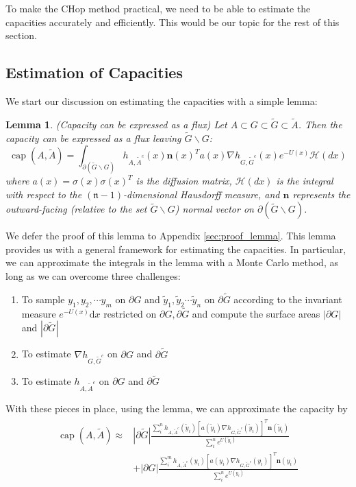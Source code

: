 \documentclass[english, aip, jcp, priprint, graphicx,floatfix]{revtex4-1}
\newtheorem{lemma}{Lemma}
\theoremstyle{plain}
\theoremstyle{definition}
\theoremstyle{plain}
\newcommand{\dimension}{{\mathfrak{n}}}
\newcommand{\hausdorffmeasure}{\mathscr{H}(dx)}
\begin{document}
To make the CHop method practical, we need to be able to estimate the capacities accurately and efficiently. This would be our topic for the rest of this section.

\subsection{Estimation of Capacities}

We start our discussion on estimating the capacities with a simple lemma:
\begin{lemma}(Capacity can be expressed as a flux) \label{lem:capacity_lemma} Let $A\subset G \subset \tilde G \subset \tilde A$.  Then the capacity can be expressed as a flux leaving $\tilde G \backslash G$:
\begin{equation*}
\ensuremath{\operatorname{cap}} (A, \tilde{A}) = \int_{\partial (\tilde G \backslash G)}  h_{A, \tilde{A}^c} (x)   \textbf{n}(x)^T a (x) \nabla h_{G, \tilde{G}^c} (x)e^{- U (x)} \hausdorffmeasure
\end{equation*}
where $a(x)=\sigma(x)\sigma(x)^T$ is the diffusion matrix, $\hausdorffmeasure$ is the integral with respect to the $(\dimension-1)$-dimensional Hausdorff measure, and $\textbf{n}$ represents the outward-facing (relative to the set $\tilde G \backslash G$) normal vector on $\partial (\tilde G \backslash G)$.
\end{lemma}

We defer the proof of this lemma to Appendix \ref{sec:proof_lemma}. This lemma provides us with a general framework for estimating the capacities.   In particular, we can approximate the integrals in the lemma with a Monte Carlo method, as long as we can overcome three challenges:
\begin{enumerate}
    \item To sample $y_1,y_2,\cdots y_m$ on $\partial G$ and $\tilde y_1,\tilde y_2 \cdots \tilde y_n$ on $\partial \tilde{G}$ according to the invariant measure $e^{- U(x)}\mathrm{d}x$ restricted on $\partial G, \partial \tilde{G}$ and compute the surface areas $|\partial G|$ and $|\partial \tilde G|$

\item To estimate $\nabla h_{G, \tilde{G}^c}$ on $\partial G$ and
$\partial \tilde{G}$

\item To estimate $h_{A, \tilde{A}^c}$ on $\partial G$ and $\partial
\tilde{G}$
\end{enumerate}
With these pieces in place, using the lemma, we can approximate the capacity by
\begin{gather}\label{eq:capesteq}
\begin{array}{cc}
\ensuremath{\operatorname{cap}} (A, \tilde{A}) \approx & 
|\partial \tilde G|\frac{\sum_i^n h_{A,\tilde A^c}(\tilde y_i)[a(\tilde y_i)\nabla h_{G,\tilde G^c}(\tilde y_i)]^T \textbf{n}(\tilde y_i)}{\sum_i^n e^{U(\tilde y_i)}} \\
& + |\partial G|\frac{\sum_i^m h_{A,\tilde A^c}(y_i)[a(y_i)\nabla h_{G,\tilde G^c}(y_i)]^T \textbf{n}(y_i)}{\sum_i^n e^{U(y_i)}} 
\end{array}
\end{gather}
\end{document}
